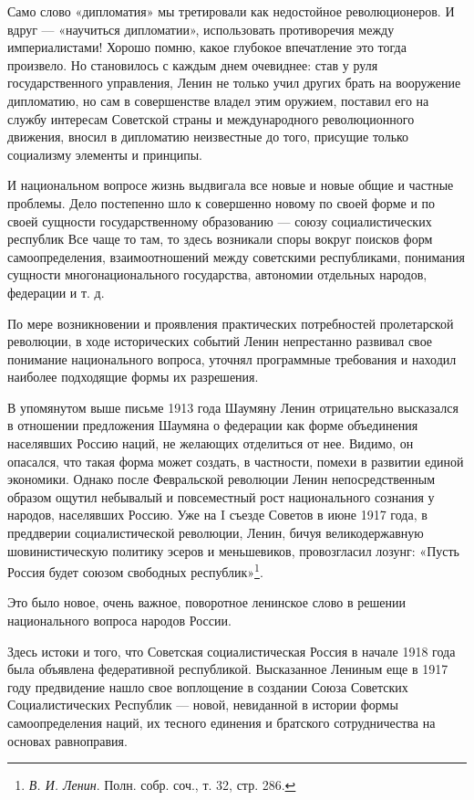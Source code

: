 \documentclass[12pt, a4paper, openany]{book}
\begin{document}
Само слово «дипломатия» мы третировали как недостойное революционеров. И вдруг — «научиться дипломатии», использовать противоречия между империалистами! Хорошо помню, какое глубокое впечатление это тогда произвело. Но становилось с каждым днем очевиднее: став у руля государственного управления, Ленин не только учил других брать на вооружение дипломатию, но сам в совершенстве владел этим оружием, поставил его на службу интересам Советской страны и международного революционного движения, вносил в дипломатию неизвестные до того, присущие только социализму элементы и принципы.

И национальном вопросе жизнь выдвигала все новые и новые общие и частные проблемы. Дело постепенно шло к совершенно новому по своей форме и по своей сущности государственному образованию — союзу социалистических республик Все чаще то там, то здесь возникали споры вокруг поисков форм самоопределения, взаимоотношений между советскими республиками, понимания сущности многонационального государства, автономии отдельных народов, федерации и т. д.

По мере возникновении и проявления практических потребностей пролетарской революции, в ходе исторических событий Ленин непрестанно развивал свое понимание национального вопроса, уточнял программные требования и находил наиболее подходящие формы их разрешения.

В упомянутом выше письме 1913 года Шаумяну Ленин отрицательно высказался в отношении предложения Шаумяна о федерации как форме объединения населявших Россию наций, не желающих отделиться от нее. Видимо, он опасался, что такая форма может создать, в частности, помехи в развитии единой экономики. Однако после Февральской революции Ленин непосредственным образом ощутил небывалый и повсеместный рост национального сознания у народов, населявших Россию. Уже на I съезде Советов в июне 1917 года, в преддверии социалистической революции, Ленин, бичуя великодержавную шовинистическую политику эсеров и меньшевиков, провозгласил лозунг: «Пусть Россия будет союзом свободных республик»\footnote{\textit{В. И. Ленин}. Полн. собр. соч., т. 32, стр. 286.}.

Это было новое, очень важное, поворотное ленинское слово в решении национального вопроса народов России.

Здесь истоки и того, что Советская социалистическая Россия в начале 1918 года была объявлена федеративной республикой. Высказанное Лениным еще в 1917 году предвидение нашло свое воплощение в создании Союза Советских Социалистических Республик — новой, невиданной в истории формы самоопределения наций, их тесного единения и братского сотрудничества на основах равноправия.
\end{document}
